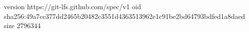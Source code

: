 version https://git-lfs.github.com/spec/v1
oid sha256:49a7cc377dd2465b20482c3551d4363513962e1c91be2bd64793bdfed1a8daed
size 2796344
